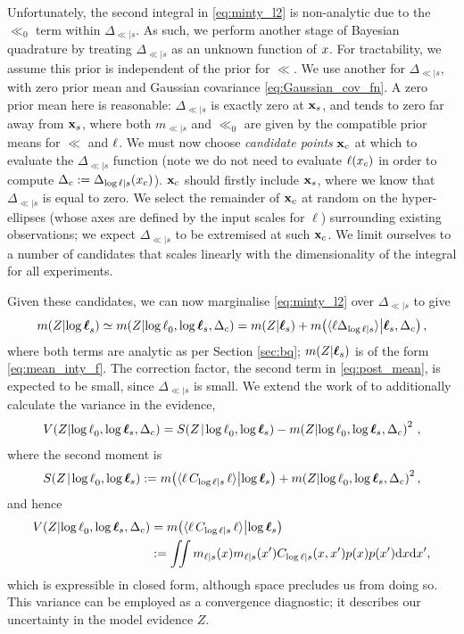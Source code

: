\documentclass{article} %
\newcommand{\De}{\Delta_{\ll|s}}
\begin{document}
Unfortunately, the second integral in \eqref{eq:minty_l2} is non-analytic due to the $\ll_0$ term within $\De$. As such, we perform another stage of Bayesian quadrature by treating $\De$ as an unknown function of $\lfv$. For tractability, we assume this prior is independent of the prior for $\ll$. We use another \gpb for $\De$, with zero prior mean and Gaussian covariance \eqref{eq:Gaussian_cov_fn}. A zero prior mean here is reasonable: $\De$ is exactly zero at $\vlfv_s$, and tends to zero far away from $\vlfv_s$, where both $m_{\ll|s}$ and $\ll_0$  are given by the compatible prior means for $\ll$ and $\lfn$. We must now choose \emph{candidate points} $\vlfv_c$ at which to evaluate the $\De$ function (note we do not need to evaluate $\lfn(\lfv_c)$ in order to compute $\Delta_c \deq \De(\lfv_c)$).
$\vlfv_c$ should firstly include $\vlfv_s$, where we know that $\De$ is equal to zero. We select the remainder of $\vlfv_c$ at random on the hyper-ellipses (whose axes are defined by the input scales for $\ell$) surrounding existing observations; we expect $\De$ to be extremised at such $\vlfv_c$. We limit ourselves to a number of candidates that scales linearly with the dimensionality of the integral for all experiments.

Given these candidates, we can now marginalise \eqref{eq:minty_l2} over $\De$ to give
\begin{equation} \label{eq:post_mean}
\mean{\If}{\vll_s} \simeq \mean{\If}{\ll_0,\tvr_s,\Delta_c} =
\mean{\If}{\vr_s} + \mean{\inty{\lfn \De}}{\vr_s, \Delta_c},
\end{equation}
where both terms are analytic as per Section \ref{sec:bq}; $\mean{\If}{\vr_s}$ is of the form \eqref{eq:mean_inty_f}. The correction factor, the second term in \eqref{eq:post_mean}, is expected to be small, since $\De$ is small. We extend the work of \cite{BQR} to additionally calculate the variance in the evidence,
\begin{align} 
\cov{\If}{\ll_0,\tvr_s,\Delta_c} = \secm{\If}{\ll_0,\tvr_s} - \mean{\If}{\ll_0,\tvr_s,\Delta_c}^2\,,
\end{align}
where the second moment is 
\begin{align}
\secm{\If}{\ll_0,\tvr_s} \deq  \mean{\inty{\lfn\,C_{\ll|s}\,\lfn}}{\tvr_s}+
\mean{\If}{\ll_0,\tvr_s,\Delta_c}^2,
\end{align}
and hence 
\begin{align} \label{eq:post_var}
\cov{\If}{\ll_0,\tvr_s,\Delta_c}  & = \mean{\inty{\lfn\,C_{\ll|s}\,\lfn}}{\tvr_s} \nonumber\\
& \deq
 \iint m_{\lfn|s}(\lfv) m_{\lfn|s}(\lfv') C_{\ll|s}(\lfv,\lfv')  p(x) p(x') \ud \lfv \ud\lfv',
\end{align}
which is expressible in closed form, although space precludes us from doing so. This variance can be employed as a convergence diagnostic; it describes our uncertainty in the model evidence $Z$.
\end{document}
